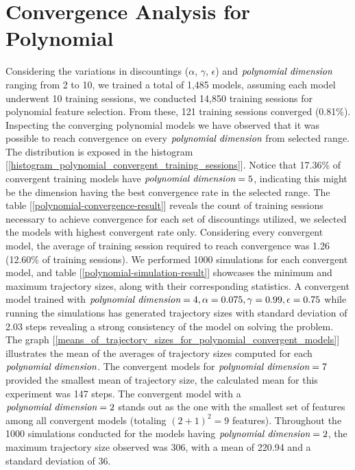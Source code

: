\documentclass[10pt,twocolumn]{article}
\begin{document}
\section{Convergence Analysis for Polynomial}
Considering the variations in discountings ($\alpha$, $\gamma$, $\epsilon$) and $\emph{polynomial dimension}$ ranging from 2 to 10, we trained a total of 1,485 models, 
 assuming each model underwent 10 training sessions, we conducted 14,850 training sessions for polynomial feature selection. From these, 121 training sessions converged (0.81\%).
  Inspecting the converging polynomial models we have observed that it was possible to reach convergence on every $\emph{polynomial dimension}$ from selected range. The distribution is exposed in the histogram [\ref{histogram_polynomial_convergent_training_sessions}]. 
  Notice that 17.36\% of convergent training models have $\emph{polynomial dimension} = 5$, indicating this might be the dimension having the best convergence rate in the selected range. 
  The table [\ref{polynomial-convergence-result}] reveals the count of training sessions necessary to achieve convergence for each set of discountings utilized,
  we selected the models with highest convergent rate only. Considering every convergent model, the average of training session required to reach convergence was 1.26 (12.60\% of training sessions). 
  We performed 1000 simulations for each convergent model, and table [\ref{polynomial-simulation-result}] showcases the minimum and maximum trajectory sizes, 
along with their corresponding statistics. A convergent model trained with $\emph{polynomial dimension} = 4, \alpha = 0.075, \gamma = 0.99, \epsilon = 0.75 $ while running the simulations has generated trajectory sizes 
with standard deviation of 2.03 steps revealing a strong consistency of the model on solving the problem. 
  The graph [\ref{means_of_trajectory_sizes_for_polynomial_convergent_models}] illustrates the mean of the averages of trajectory sizes computed for each $\emph{polynomial dimension}$. 
  The convergent models for $\emph{polynomial dimension} = 7$ provided the smallest mean of trajectory size, the calculated mean for this experiment was 147 steps. The convergent model with a $\emph{polynomial dimension} = 2$ stands out as the one with the smallest 
  set of features among all convergent models (totaling $(2 + 1)^2 = 9$ features). Throughout the 1000 simulations conducted for the models having $\emph{polynomial dimension} = 2$, 
  the maximum trajectory size observed was 306, with a mean of 220.94 and a standard deviation of 36.  
\end{document}
